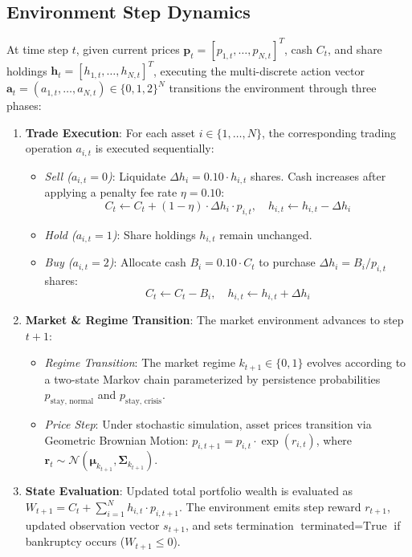 \documentclass[pdflatex,sn-mathphys-num]{sn-jnl}
\begin{document}
\subsection{Environment Step Dynamics}
At time step $t$, given current prices $\mathbf{p}_t = [p_{1,t}, \dots, p_{N,t}]^T$, cash $C_t$, and share holdings $\mathbf{h}_t = [h_{1,t}, \dots, h_{N,t}]^T$, executing the multi-discrete action vector $\mathbf{a}_t = (a_{1,t}, \dots, a_{N,t}) \in \{0, 1, 2\}^N$ transitions the environment through three phases:

\begin{enumerate}
    \item \textbf{Trade Execution}: For each asset $i \in \{1, \dots, N\}$, the corresponding trading operation $a_{i,t}$ is executed sequentially:
    \begin{itemize}
        \item \textit{Sell ($a_{i,t} = 0$)}: Liquidate $\Delta h_i = 0.10 \cdot h_{i,t}$ shares. Cash increases after applying a penalty fee rate $\eta = 0.10$:
        \begin{equation}
            C_t \leftarrow C_t + (1 - \eta) \cdot \Delta h_i \cdot p_{i,t}, \quad h_{i,t} \leftarrow h_{i,t} - \Delta h_i
        \end{equation}
        \item \textit{Hold ($a_{i,t} = 1$)}: Share holdings $h_{i,t}$ remain unchanged.
        \item \textit{Buy ($a_{i,t} = 2$)}: Allocate cash $B_i = 0.10 \cdot C_t$ to purchase $\Delta h_i = B_i / p_{i,t}$ shares:
        \begin{equation}
            C_t \leftarrow C_t - B_i, \quad h_{i,t} \leftarrow h_{i,t} + \Delta h_i
        \end{equation}
    \end{itemize}
    
    \item \textbf{Market \& Regime Transition}: The market environment advances to step $t+1$:
    \begin{itemize}
        \item \textit{Regime Transition}: The market regime $k_{t+1} \in \{0, 1\}$ evolves according to a two-state Markov chain parameterized by persistence probabilities $p_{\text{stay, normal}}$ and $p_{\text{stay, crisis}}$.
        \item \textit{Price Step}: Under stochastic simulation, asset prices transition via Geometric Brownian Motion: $p_{i,t+1} = p_{i,t} \cdot \exp(r_{i,t})$, where $\mathbf{r}_t \sim \mathcal{N}(\boldsymbol{\mu}_{k_{t+1}}, \mathbf{\Sigma}_{k_{t+1}})$.
    \end{itemize}
    
    \item \textbf{State Evaluation}: Updated total portfolio wealth is evaluated as $W_{t+1} = C_t + \sum_{i=1}^N h_{i,t} \cdot p_{i,t+1}$. The environment emits step reward $r_{t+1}$, updated observation vector $s_{t+1}$, and sets termination $\text{terminated} = \text{True}$ if bankruptcy occurs ($W_{t+1} \le 0$).
\end{enumerate}
\end{document}
